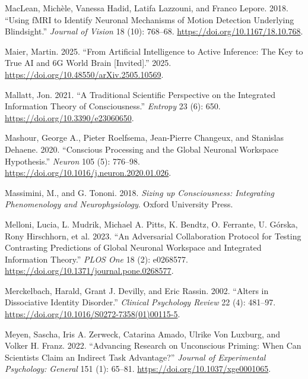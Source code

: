 \documentclass[
  a4paper]{article}
\newlength{\cslhangindent}
\newenvironment{CSLReferences}[2] %
 {\begin{list}{}{%
  \setlength{\itemindent}{0pt}
  \setlength{\leftmargin}{0pt}
  \setlength{\parsep}{0pt}
  \ifodd #1
   \setlength{\leftmargin}{\cslhangindent}
   \setlength{\itemindent}{-1\cslhangindent}
  \fi
  \setlength{\itemsep}{#2\baselineskip}}}
 {\end{list}}
\begin{document}
\begin{CSLReferences}{1}{0}
MacLean, Michèle, Vanessa Hadid, Latifa Lazzouni, and Franco Lepore.
2018. {``Using {fMRI} to Identify Neuronal Mechanisms of Motion
Detection Underlying Blindsight.''} \emph{Journal of Vision} 18 (10):
768--68. \url{https://doi.org/10.1167/18.10.768}.

Maier, Martin. 2025. {``From Artificial Intelligence to Active
Inference: The Key to True {AI} and {6G} World Brain {[}Invited{]}.''}
2025. \url{https://doi.org/10.48550/arXiv.2505.10569}.

Mallatt, Jon. 2021. {``A Traditional Scientific Perspective on the
Integrated Information Theory of Consciousness.''} \emph{Entropy} 23
(6): 650. \url{https://doi.org/10.3390/e23060650}.

Mashour, George A., Pieter Roelfsema, Jean-Pierre Changeux, and
Stanislas Dehaene. 2020. {``Conscious Processing and the Global Neuronal
Workspace Hypothesis.''} \emph{Neuron} 105 (5): 776--98.
\url{https://doi.org/10.1016/j.neuron.2020.01.026}.

Massimini, M., and G. Tononi. 2018. \emph{Sizing up Consciousness:
Integrating Phenomenology and Neurophysiology}. Oxford University Press.

Melloni, Lucia, L. Mudrik, Michael A. Pitts, K. Bendtz, O. Ferrante, U.
Górska, Rony Hirschhorn, et al. 2023. {``An Adversarial Collaboration
Protocol for Testing Contrasting Predictions of Global Neuronal
Workspace and Integrated Information Theory.''} \emph{PLOS One} 18 (2):
e0268577. \url{https://doi.org/10.1371/journal.pone.0268577}.

Merckelbach, Harald, Grant J. Devilly, and Eric Rassin. 2002. {``Alters
in Dissociative Identity Disorder.''} \emph{Clinical Psychology Review}
22 (4): 481--97. \url{https://doi.org/10.1016/S0272-7358(01)00115-5}.

Meyen, Sascha, Iris A. Zerweck, Catarina Amado, Ulrike Von Luxburg, and
Volker H. Franz. 2022. {``Advancing Research on Unconscious Priming:
When Can Scientists Claim an Indirect Task Advantage?''} \emph{Journal
of Experimental Psychology: General} 151 (1): 65--81.
\url{https://doi.org/10.1037/xge0001065}.


\end{CSLReferences}
\end{document}
